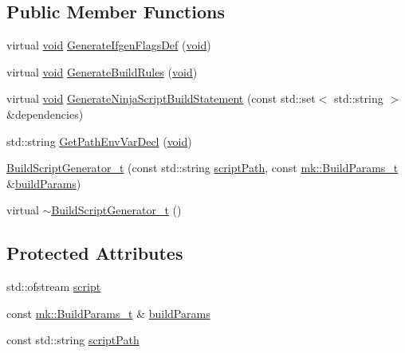 \subsection*{Public Member Functions}
\begin{DoxyCompactItemize}
\item 
virtual \hyperlink{_t_e_m_p_l_a_t_e__cdef_8h_ac9c84fa68bbad002983e35ce3663c686}{void} \hyperlink{classninja_1_1_build_script_generator__t_a9647fa6a4aacaa06c65f9941711e372f}{Generate\+Ifgen\+Flags\+Def} (\hyperlink{_t_e_m_p_l_a_t_e__cdef_8h_ac9c84fa68bbad002983e35ce3663c686}{void})
\item 
virtual \hyperlink{_t_e_m_p_l_a_t_e__cdef_8h_ac9c84fa68bbad002983e35ce3663c686}{void} \hyperlink{classninja_1_1_build_script_generator__t_a88abe27290cbefb32ea4747766972d01}{Generate\+Build\+Rules} (\hyperlink{_t_e_m_p_l_a_t_e__cdef_8h_ac9c84fa68bbad002983e35ce3663c686}{void})
\item 
virtual \hyperlink{_t_e_m_p_l_a_t_e__cdef_8h_ac9c84fa68bbad002983e35ce3663c686}{void} \hyperlink{classninja_1_1_build_script_generator__t_ad7ad2e9a5302cb7910eac2d7f6f02320}{Generate\+Ninja\+Script\+Build\+Statement} (const std\+::set$<$ std\+::string $>$ \&dependencies)
\item 
std\+::string \hyperlink{classninja_1_1_build_script_generator__t_a533525726b9ebcc8f4f48cc887f0de09}{Get\+Path\+Env\+Var\+Decl} (\hyperlink{_t_e_m_p_l_a_t_e__cdef_8h_ac9c84fa68bbad002983e35ce3663c686}{void})
\item 
\hyperlink{classninja_1_1_build_script_generator__t_a0fe2106ffa43dc5ac4e58eabc4043701}{Build\+Script\+Generator\+\_\+t} (const std\+::string \hyperlink{classninja_1_1_build_script_generator__t_a0b5b6220fcc0c2314c1053f1045ab640}{script\+Path}, const \hyperlink{structmk_1_1_build_params__t}{mk\+::\+Build\+Params\+\_\+t} \&\hyperlink{classninja_1_1_build_script_generator__t_a00e02ae3f2cd8a5293e8211f2b2fe3f0}{build\+Params})
\item 
virtual \hyperlink{classninja_1_1_build_script_generator__t_ab70e9b5b5a403ad5afe2924882dd5ae0}{$\sim$\+Build\+Script\+Generator\+\_\+t} ()
\end{DoxyCompactItemize}
\subsection*{Protected Attributes}
\begin{DoxyCompactItemize}
\item 
std\+::ofstream \hyperlink{classninja_1_1_build_script_generator__t_a85a5d0b1889526f54cae31b7df774c6d}{script}
\item 
const \hyperlink{structmk_1_1_build_params__t}{mk\+::\+Build\+Params\+\_\+t} \& \hyperlink{classninja_1_1_build_script_generator__t_a00e02ae3f2cd8a5293e8211f2b2fe3f0}{build\+Params}
\item 
const std\+::string \hyperlink{classninja_1_1_build_script_generator__t_a0b5b6220fcc0c2314c1053f1045ab640}{script\+Path}
\end{DoxyCompactItemize}

